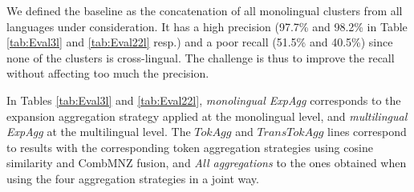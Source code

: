 \documentclass[output=paper]{langsci/langscibook}
\begin{document}
\begin{table}
\centering
{}
\caption{Cluster aggregation strategies on 22 languages.}
\label{tab:Eval22l}
\end{table}

We defined the baseline as the concatenation of all monolingual
clusters from all languages under consideration. It has a high
precision (97.7\% and 98.2\% in Table \ref{tab:Eval3l} and
\ref{tab:Eval22l} resp.) and a poor recall (51.5\% and 40.5\%) since
none of the clusters is cross-lingual. The challenge is thus to
improve the recall without affecting too much the precision.

In Tables \ref{tab:Eval3l} and \ref{tab:Eval22l}, \textit{monolingual
  ExpAgg} corresponds to the expansion aggregation strategy applied at
the monolingual level, and \textit{multilingual ExpAgg} at the
multilingual level.  The $TokAgg$ and $TransTokAgg$ lines correspond
to results with the corresponding token aggregation strategies using
cosine similarity and CombMNZ fusion, and \textit{All aggregations} to
the ones obtained when using the four aggregation strategies in a
joint way.
\end{document}
